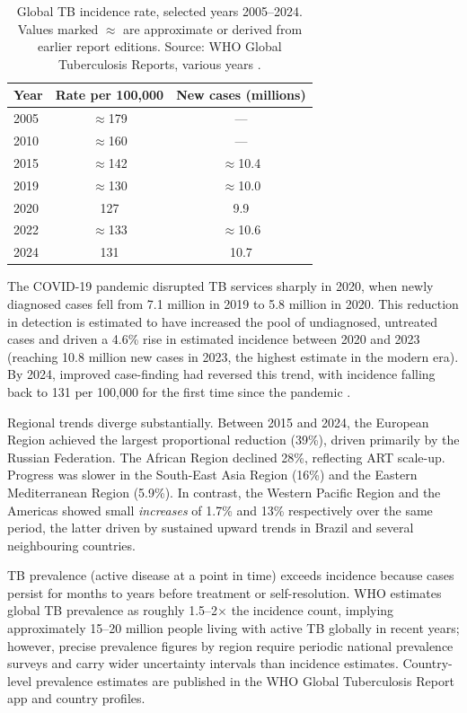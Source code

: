 \documentclass[11pt]{article}
\begin{document}
\begin{table}[h]
\centering
\caption{Global TB incidence rate, selected years 2005--2024. Values marked $\approx$ are approximate or derived from earlier report editions. Source: WHO Global Tuberculosis Reports, various years \citep{who2025global}.}
\label{tab:global_trend}
\begin{tabular}{lcc}
\toprule
\textbf{Year} & \textbf{Rate per 100{,}000} & \textbf{New cases (millions)} \\
\midrule
2005  & $\approx$179 & --- \\
2010  & $\approx$160 & --- \\
2015  & $\approx$142 & $\approx$10.4 \\
2019  & $\approx$130 & $\approx$10.0 \\
2020  & 127          & 9.9  \\
2022  & $\approx$133 & $\approx$10.6 \\
2024  & 131          & 10.7 \\
\bottomrule
\end{tabular}
\end{table}

The COVID-19 pandemic disrupted TB services sharply in 2020, when newly diagnosed cases fell from 7.1 million in 2019 to 5.8 million in 2020. This reduction in detection is estimated to have increased the pool of undiagnosed, untreated cases and driven a 4.6\% rise in estimated incidence between 2020 and 2023 (reaching 10.8 million new cases in 2023, the highest estimate in the modern era). By 2024, improved case-finding had reversed this trend, with incidence falling back to 131 per 100{,}000 for the first time since the pandemic \citep{who2025global}.

Regional trends diverge substantially. Between 2015 and 2024, the European Region achieved the largest proportional reduction (39\%), driven primarily by the Russian Federation. The African Region declined 28\%, reflecting ART scale-up. Progress was slower in the South-East Asia Region (16\%) and the Eastern Mediterranean Region (5.9\%). In contrast, the Western Pacific Region and the Americas showed small \textit{increases} of 1.7\% and 13\% respectively over the same period, the latter driven by sustained upward trends in Brazil and several neighbouring countries.

TB prevalence (active disease at a point in time) exceeds incidence because cases persist for months to years before treatment or self-resolution. WHO estimates global TB prevalence as roughly 1.5--2$\times$ the incidence count, implying approximately 15--20 million people living with active TB globally in recent years; however, precise prevalence figures by region require periodic national prevalence surveys and carry wider uncertainty intervals than incidence estimates. Country-level prevalence estimates are published in the WHO Global Tuberculosis Report app and country profiles.
\end{document}
